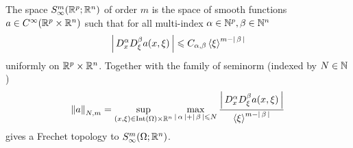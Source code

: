 \documentclass[12pt]{article}
\begin{document}
\begin{fdefinition}
    The space $S^m_\infty(\R^p; \R^n)$ of order $m$ is the space of smooth functions $a \in C^\infty(\R^p \times \R^n)$ such that for all multi-index $\alpha \in \N^p, \beta \in \N^n$
    \begin{align*}
        \abs{D^\alpha_x D^\beta_\xi a (x, \xi)} \leq C_{\alpha, \beta} \sym[\xi]^{m - \abs{\beta}} 
    \end{align*}
    uniformly on $\R^p \times \R^n$. Together with the family of seminorm (indexed by $N \in \N$) 
    \begin{align*}
        \norm[a]_{N, m} = \sup_{(x, \xi) \in \mathrm{Int}(\Omega) \times \R^n} \max_{\abs{\alpha} + \abs{\beta} \leq N} \frac{\abs{D^\alpha_x D^\beta_\xi a(x, \xi)}}{\sym[\xi]^{m - \abs{\beta}}} 
    \end{align*}
    gives a Frechet topology to $S^m_\infty(\Omega; \R^n)$. \\
\end{fdefinition}
\end{document}
